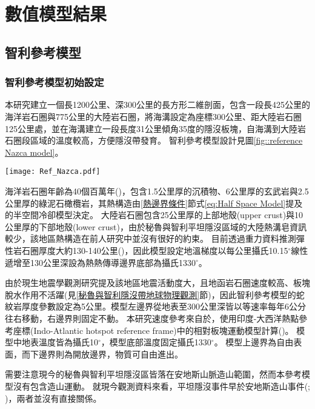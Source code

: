 
\chapter{數值模型結果}

\section{智利參考模型}
\subsection{智利參考模型初始設定}\label{智利參考模型初始模型設定}
本研究建立一個長1200公里、深300公里的長方形二維剖面，包含一段長425公里的海洋岩石圈與775公里的大陸岩石圈，將海溝設定為座標300公里、距大陸岩石圈125公里處，並在海溝建立一段長度31公里傾角35度的隱沒板塊，自海溝到大陸岩石圈段區域的溫度較高，方便隱沒帶發育。
智利參考模型設計見圖\ref{fig::reference Nazca model}。

\begin{figure*}[hb]
    \centering
    \texttt{[image: Ref\_Nazca.pdf]}
    \caption[智利參考模型設計與邊界條件示意圖]{智利參考模型設計與邊界條件示意圖}
    \label{fig::reference Nazca model}
\end{figure*}

海洋岩石圈年齡為40個百萬年(\citealp{muller2019})，包含1.5公里厚的沉積物、6公里厚的玄武岩與2.5公里厚的綠泥石橄欖岩，其熱構造由\ref{熱邊界條件}節式\ref{eq:Half Space Model}提及的半空間冷卻模型決定。
大陸岩石圈包含25公里厚的上部地殼(upper crust)與10公里厚的下部地殼(lower crust)，由於秘魯與智利平坦隱沒區域的大陸熱溝皂資訊較少，該地區熱構造在前人研究中並沒有很好的約束。
目前透過重力資料推測彈性岩石圈厚度大約130-140公里(\citealp{perez2008})，因此模型設定地溫梯度以每公里攝氏10.15$^{\circ}$線性遞增至130公里深設為熱熱傳導邊界底部為攝氏1330$^{\circ}$。

由於現生地震學觀測研究提及該地區地震活動度大，且地函岩石圈速度較高、板塊脫水作用不活躍(見\ref{秘魯與智利隱沒帶地球物理觀測}節)，因此智利參考模型的蛇紋岩厚度參數設定為5公里。模型左邊界從地表至300公里深皆以等速率每年6公分往右移動，右邊界則固定不動。
本研究速度參考來自於\citealp{o2005uncertainties}，使用印度-大西洋熱點參考座標(Indo-Atlantic hotspot reference frame)中的相對板塊運動模型計算(\citealp{schellart2008global})。
模型中地表溫度皆為攝氏10$^{\circ}$，模型底部溫度固定攝氏1330$^{\circ}$。
模型上邊界為自由表面，而下邊界則為開放邊界，物質可自由進出。

需要注意現今的秘魯與智利平坦隱沒區皆落在安地斯山脈造山範圍，然而本參考模型沒有包含造山運動。
就現今觀測資料來看，平坦隱沒事件早於安地斯造山事件(\citealp{chen2019southward}; \citealp{hu2021southward})，兩者並沒有直接關係。


